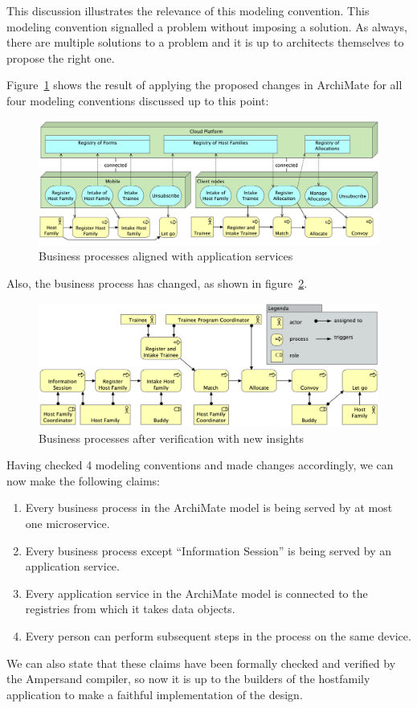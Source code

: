 \documentclass[sn-vancouver]{sn-jnl}%
\begin{document}
This discussion illustrates the relevance of this modeling convention.
This modeling convention signalled a problem without imposing a solution.
As always, there are multiple solutions to a problem and it is up to architects themselves to propose the right one.

Figure~\ref{fig: Adapted service alignment} shows the result of applying the proposed changes in ArchiMate for all four modeling conventions discussed up to this point:
\begin{figure}[b]
  \centering
  \includegraphics[clip=true, scale=0.0627]{Services na Uitvoering.png}
  \caption{Business processes aligned with application services}
  \label{fig: Adapted service alignment}
\end{figure}
Also, the business process has changed, as shown in figure~\ref{fig: Business Process na Uitvoering}.
\begin{figure}[b]
\centering
    \includegraphics[clip=true, scale=0.254]{Business Process na Uitvoering.png}
\caption{Business processes after verification with new insights}
\label{fig: Business Process na Uitvoering}
\end{figure}

Having checked 4 modeling conventions and made changes accordingly, we can now make the following claims:
\begin{enumerate}
    \item Every business process in the ArchiMate model is being served by at most one microservice.
    \item Every business process except ``Information Session'' is being served by an application service.
    \item Every application service in the ArchiMate model is connected to the registries from which it takes data objects.
    \item Every person can perform subsequent steps in the process on the same device.
\end{enumerate}
We can also state that these claims have been formally checked and verified by the Ampersand compiler,
so now it is up to the builders of the hostfamily application to make a faithful implementation of the design.
\end{document}
